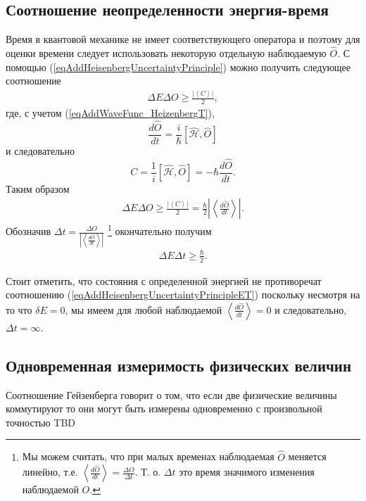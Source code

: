 \subsection{Соотношение неопределенности энергия-время}
\label{AddHeisenbergUncertaintyPrincipleEnergyTime}
Время в квантовой механике не имеет соответствующего оператора и
поэтому для оценки времени следует использовать некоторую отдельную
наблюдаемую $\hat{O}$. С помощью
(\ref{eqAddHeisenbergUncertaintyPrinciple}) можно получить следующее
соотношение
\begin{eqnarray}
  \Delta E \Delta O \ge \frac{\left|\left< C \right>\right|}{2},
  \nonumber
\end{eqnarray}
где, с учетом (\ref{eqAddWaveFunc_HeizenbergT}),
\[
\frac{d \hat{O}}{d t} = \frac{i}{\hbar}
\left[\hat{\mathcal{H}}, \hat{O}\right]
\]
и следовательно
\[
C = \frac{1}{i}\left[\hat{\mathcal{H}}, \hat{O}\right] =
- \hbar \frac{d \hat{O}}{d t}.
\]
Таким образом
\begin{eqnarray}
  \Delta E \Delta O \ge \frac{\left|\left< C \right>\right|}{2} =
  \frac{\hbar}{2}\left|\left<\frac{d \hat{O}}{d t}\right>\right|.
  \nonumber
\end{eqnarray}
Обозначив $\Delta t = \frac{\Delta O}{\left|\left<\frac{d \hat{O}}{d
    t}\right>\right|}$
\footnote{
  Мы можем считать, что при малых временах наблюдаемая $\hat{O}$
  меняется линейно, т.е. $\left<\frac{d \hat{O}}{dt}\right> =
  \frac{\Delta O}{\Delta t}$. Т. о. $\Delta t$ это время значимого
  изменения наблюдаемой $O$. 
}
окончательно получим
\begin{eqnarray}
  \Delta E \Delta t \ge \frac{\hbar}{2}.
  \label{eqAddHeisenbergUncertaintyPrincipleET}
\end{eqnarray}

Стоит отметить, что состояния с определенной энергией не противоречат
соотношению (\ref{eqAddHeisenbergUncertaintyPrincipleET}) поскольку
несмотря на то что $\delta E = 0$, мы имеем для любой наблюдаемой
$\left<\frac{d \hat{O}}{dt}\right> = 0$ и следовательно, $\Delta t =
\infty$. 

\subsection{Одновременная измеримость физических величин}
\label{AddHeisenbergUncertaintyPrincipleMesuranmet}
Соотношение Гейзенберга говорит о том, что если две физические
величины коммутируют то они могут быть измерены одновременно с
произвольной точностью TBD
